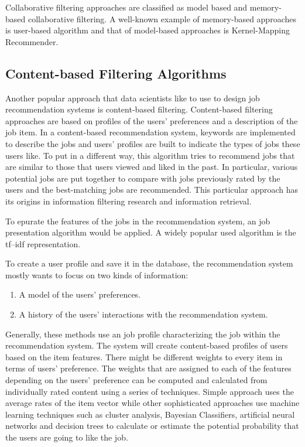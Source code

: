 \documentclass[sigconf]{acmart}
\begin{document}
\par Collaborative filtering approaches are classified as model based and memory-based collaborative filtering. A well-known example of memory-based approaches is user-based algorithm and that of model-based approaches is Kernel-Mapping Recommender.


\subsection{Content-based Filtering Algorithms}
Another popular approach that data scientists like to use to design job recommendation systems is content-based filtering. Content-based filtering approaches are based on profiles of the users’ preferences and a description of the job item. In a content-based recommendation system, keywords are implemented to describe the jobs and users' profiles are built to indicate the types of jobs these users like. To put in a different way, this algorithm tries to recommend jobs that are similar to those that users viewed and liked in the past. In particular, various potential jobs are put together to compare with jobs previously rated by the users and the best-matching jobs are recommended. This particular approach has its origins in information filtering research and information retrieval.

\par To epurate the features of the jobs in the recommendation system, an job presentation algorithm would be applied. A widely popular used algorithm is the tf–idf representation.

\par To create a user profile and save it in the database, the recommendation system mostly wants to focus on two kinds of information:
\begin{enumerate}
  \item A model of the users' preferences.
  \item A history of the users' interactions with the recommendation system.
\end{enumerate}

\par Generally, these methods use an job profile characterizing the job within the recommendation system. The system will create content-based profiles of users based on the item features. There might be different weights to every item in terms of users' preference. The weights that are assigned to each of the features depending on the users' preference can be computed and calculated from individually rated content using a series of techniques. Simple approach uses the average rates of the item vector while other sophisticated approaches use machine learning techniques such as cluster analysis, Bayesian Classifiers, artificial neural networks and decision trees to calculate or estimate the potential probability that the users are going to like the job.
\end{document}
